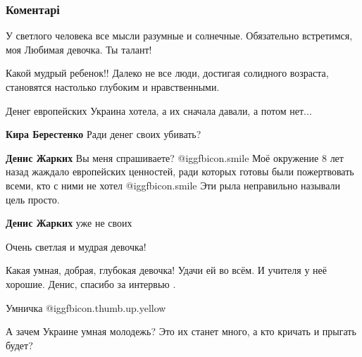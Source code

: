  
 
 
 
 
\subsubsection{Коментарі}
\label{sec:15_09_2021.fb.zharkih_denis.1.interview_savenkova.cmt}

\begin{itemize} %
У светлого человека все мысли разумные и солнечные. Обязательно встретимся, моя Любимая девочка. Ты талант!

Какой мудрый ребенок!! Далеко не все люди, достигая солидного возраста, становятся настолько глубоким и нравственными.

Денег европейских Украина хотела, а их сначала давали, а потом нет...

\begin{itemize} %
\textbf{Кира Берестенко} Ради денег своих убивать?

\textbf{Денис Жарких} Вы меня спрашиваете?  @igg{fbicon.smile}  Моё окружение 8 лет назад жаждало европейских ценностей, ради которых готовы были пожертвовать всеми, кто с ними не хотел  @igg{fbicon.smile}  Эти рыла неправильно называли цель просто.

\textbf{Денис Жарких} уже не своих
\end{itemize} %

Очень светлая и мудрая девочка!

Какая умная, добрая, глубокая девочка! Удачи ей во всём.
И учителя у неё хорошие.
Денис, спасибо за интервью .

Умничка  @igg{fbicon.thumb.up.yellow} 

А зачем Украине умная молодежь? Это их станет много, а кто кричать и прыгать будет?

\end{itemize} %
